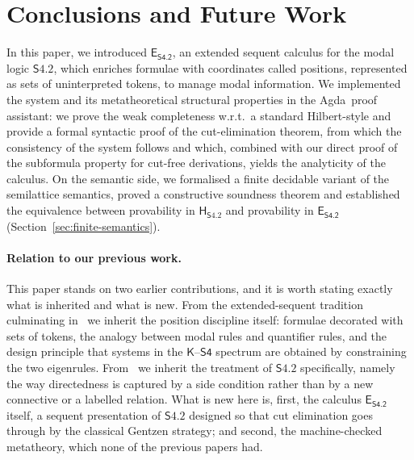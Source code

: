 \documentclass{article}
\newcommand{\logic}{\mathsf{S4.2}}
\newcommand{\axname}[1]{\mathsf{#1}}
\newcommand{\eseq}{\mathsf{E}_{{\textsf{S4.2}}}}
\newcommand{\agda}{\textsf{Agda}}
\newcommand{\hilbertlogic}[1]{\mathsf{H}_{#1}}
\theoremstyle{definition}
\begin{document}
\section{Conclusions and Future Work}\label{sec:conclusions_future}

\newcommand{\framework}{\mathsf{NAMOR}}

In this paper, we introduced $\mathsf{E}_{\textsf{S4.2}}$, an extended sequent calculus for the modal logic $\logic$, which enriches formulae with coordinates called positions, represented as sets of uninterpreted tokens, to manage modal information. We implemented the system and its metatheoretical structural properties in the \agda{}~proof assistant: we prove the weak completeness w.r.t.\ a standard Hilbert-style and provide a formal syntactic proof of the cut-elimination theorem, from which the consistency of the system follows and which, combined with our direct proof of the subformula property for cut-free derivations, yields the analyticity of the calculus.
On the semantic side, we formalised a finite decidable variant of the semilattice semantics, proved a constructive soundness theorem and established the equivalence between provability in $\hilbertlogic{\logic}$ and provability in $\eseq$ (Section~\ref{sec:finite-semantics}).


\paragraph{Relation to our previous work.}
This paper stands on two earlier contributions, and it is worth stating exactly what is inherited and what is new. From the extended-sequent tradition culminating in~\cite{Martini2023:CutElimination} we inherit the position discipline itself: formulae decorated with sets of tokens, the analogy between modal rules and quantifier rules, and the design principle that systems in the $\axname{K}$--$\axname{S4}$ spectrum are obtained by constraining the two eigenrules. From~\cite{Martini2024:S42NaturalDeduction} we inherit the treatment of $\logic$ specifically, namely the way directedness is captured by a side condition rather than by a new connective or a labelled relation. What is new here is, first, the calculus $\eseq$ itself, a sequent presentation of $\logic$ designed so that cut elimination goes through by the classical Gentzen strategy; and second, the machine-checked metatheory, which none of the previous papers had.
\end{document}
